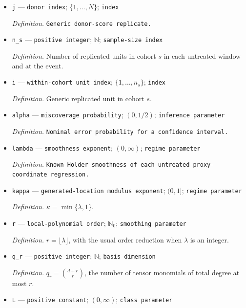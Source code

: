 \documentclass{article}
\begin{document}
\begin{itemize}
  \par\smallskip\noindent\emph{Definition.} \texttt{Indicator for the untreated or treated event path.}
  \item \texttt{j} --- \texttt{donor index}; \(\{1,\ldots,N\}\); \texttt{index}
  \par\smallskip\noindent\emph{Definition.} \texttt{Generic donor-\allowbreak{}score replicate.}
  \item \texttt{n\_\allowbreak{}s} --- \texttt{positive integer}; \(\mathbb N\); \texttt{sample-\allowbreak{}size index}
  \par\smallskip\noindent\emph{Definition.} Number of replicated units in cohort \(s\) in each untreated window and at the event.
  \item \texttt{i} --- \texttt{within-\allowbreak{}cohort unit index}; \(\{1,\ldots,n_s\}\); \texttt{index}
  \par\smallskip\noindent\emph{Definition.} Generic replicated unit in cohort \(s\).
  \item \texttt{alpha} --- \texttt{miscoverage probability}; \((0,1/2)\); \texttt{inference parameter}
  \par\smallskip\noindent\emph{Definition.} \texttt{Nominal error probability for a confidence interval.}
  \item \texttt{lambda} --- \texttt{smoothness exponent}; \((0,\infty)\); \texttt{regime parameter}
  \par\smallskip\noindent\emph{Definition.} \texttt{Known Holder smoothness of each untreated proxy-\allowbreak{}coordinate regression.}
  \item \texttt{kappa} --- \texttt{generated-\allowbreak{}location modulus exponent}; \((0,1]\); \texttt{regime parameter}
  \par\smallskip\noindent\emph{Definition.} \(\kappa=\min\{\lambda,1\}\).
  \item \texttt{r} --- \texttt{local-\allowbreak{}polynomial order}; \(\mathbb N_0\); \texttt{smoothing parameter}
  \par\smallskip\noindent\emph{Definition.} \(r=\lfloor\lambda\rfloor\), with the usual order reduction when \(\lambda\) is an integer.
  \item \texttt{q\_\allowbreak{}r} --- \texttt{positive integer}; \(\mathbb N\); \texttt{basis dimension}
  \par\smallskip\noindent\emph{Definition.} \(q_r=\binom{d+r}{r}\), the number of tensor monomials of total degree at most \(r\).
  \item \texttt{L} --- \texttt{positive constant}; \((0,\infty)\); \texttt{class parameter}

\end{itemize}
\end{document}
